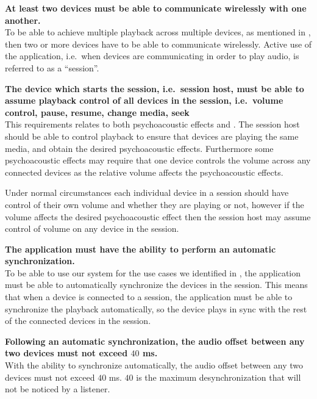 \begin{eletterate}
    \item\label{req:wireless} \textbf{At least two devices must be able to communicate wirelessly with one another.} \hfill\\
        To be able to achieve multiple playback across multiple devices, as mentioned in ,
        then two or more devices have to be able to communicate wirelessly.
        Active use of the application, i.e.~when devices are communicating in order to play audio, is referred to as a ``session''.

    \item\label{req:host_control} \textbf{The device which starts the session, i.e.~session host, must be able to assume playback control of all devices in the session, i.e.~volume control, pause, resume, change media, seek} \hfill\\
        This requirements relates to both psychoacoustic effects and .
        The session host should be able to control playback to ensure that devices are playing the same media, and obtain the desired psychoacoustic effects.
        Furthermore some psychoacoustic effects may require that one device controls the volume across any connected devices as the relative volume affects the psychoacoustic effects.

        Under normal circumstances each individual device in a session should have control of their own volume and whether they are playing or not, however if the volume affects the desired psychoacoustic effect then the session host may assume control of volume on any device in the session.


    \item\label{req:sync} \textbf{The application must have the ability to perform an automatic synchronization.} \hfill\\
        To be able to use our system for the use cases we identified in ,
        the application must be able to automatically synchronize the devices in the session.
        This means that when a device is connected to a session, the application must be able to synchronize the playback automatically,
        so the device plays in sync with the rest of the connected devices in the session.

    \begin{eletterate}
        \item \textbf{Following an automatic synchronization, the audio offset between any two devices must not exceed $40$ ms.} \hfill\\
            With the ability to synchronize automatically, the audio offset between any two devices must not exceed $40$ ms.
            $40$ is the maximum desynchronization that will not be noticed by a listener.


\end{eletterate}
\end{eletterate}

